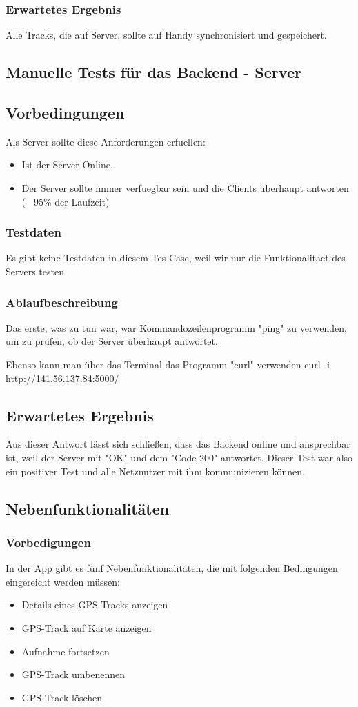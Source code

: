 \documentclass{article}
\begin{document}
\subsubsection{Erwartetes Ergebnis}
	Alle Tracks, die auf Server, sollte auf Handy synchronisiert und gespeichert.

\subsection{Manuelle Tests für das Backend - Server}
\subsection{Vorbedingungen}
	Als Server sollte diese Anforderungen erfuellen:
		\begin{itemize}
			\item Ist der Server Online.
			\item Der Server sollte immer verfuegbar sein und die Clients überhaupt antworten (~ 95\% der Laufzeit)
		\end{itemize}
\subsubsection{Testdaten}
	Es gibt keine Testdaten in diesem Tes-Case, weil wir nur die Funktionalitaet des Servers testen
\subsubsection{Ablaufbeschreibung}
	Das erste, was zu tun war, war Kommandozeilenprogramm "ping" zu verwenden, um zu prüfen, ob der Server überhaupt antwortet.\par
	Ebenso kann man über das Terminal das Programm "curl" verwenden curl -i http://141.56.137.84:5000/ \par
\subsection{Erwartetes Ergebnis}
	Aus dieser Antwort lässt sich schließen, dass das Backend online und ansprechbar ist, weil der Server mit "OK" und dem "Code 200" antwortet. Dieser Test war also ein positiver Test und alle Netznutzer mit ihm kommunizieren können.
	
\subsection{Nebenfunktionalitäten}
\subsubsection{Vorbedigungen}
	In der App gibt es fünf Nebenfunktionalitäten, die mit folgenden Bedingungen eingereicht werden müssen:
	\begin{itemize}
		\item Details eines GPS-Tracks anzeigen
		\item GPS-Track auf Karte anzeigen	
		\item Aufnahme fortsetzen
		\item GPS-Track umbenennen
		\item GPS-Track löschen	
	\end{itemize}
\end{document}
